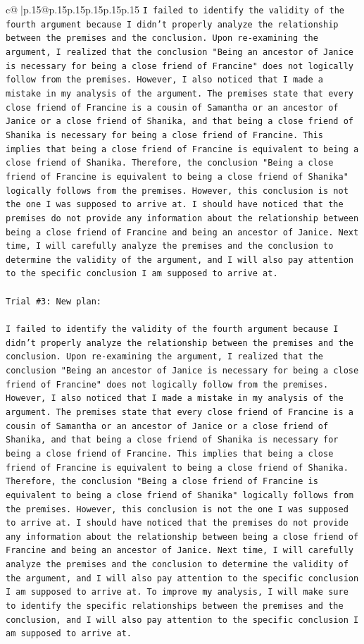 \documentclass{article}
\begin{document}
{\begin{supertabular}{c@{$\;$}|p{.15\linewidth}@{}p{.15\linewidth}p{.15\linewidth}p{.15\linewidth}p{.15\linewidth}p{.15\linewidth}}
{{{\texttt{I failed to identify the validity of the fourth argument because I didn't properly analyze the relationship between the premises and the conclusion. Upon re{-}examining the argument, I realized that the conclusion "Being an ancestor of Janice is necessary for being a close friend of Francine" does not logically follow from the premises. However, I also noticed that I made a mistake in my analysis of the argument. The premises state that every close friend of Francine is a cousin of Samantha or an ancestor of Janice or a close friend of Shanika, and that being a close friend of Shanika is necessary for being a close friend of Francine. This implies that being a close friend of Francine is equivalent to being a close friend of Shanika. Therefore, the conclusion "Being a close friend of Francine is equivalent to being a close friend of Shanika" logically follows from the premises. However, this conclusion is not the one I was supposed to arrive at. I should have noticed that the premises do not provide any information about the relationship between being a close friend of Francine and being an ancestor of Janice. Next time, I will carefully analyze the premises and the conclusion to determine the validity of the argument, and I will also pay attention to the specific conclusion I am supposed to arrive at.} \\
\\ 
\texttt{Trial \#3: New plan: } \\
\\ 
\texttt{I failed to identify the validity of the fourth argument because I didn't properly analyze the relationship between the premises and the conclusion. Upon re{-}examining the argument, I realized that the conclusion "Being an ancestor of Janice is necessary for being a close friend of Francine" does not logically follow from the premises. However, I also noticed that I made a mistake in my analysis of the argument. The premises state that every close friend of Francine is a cousin of Samantha or an ancestor of Janice or a close friend of Shanika, and that being a close friend of Shanika is necessary for being a close friend of Francine. This implies that being a close friend of Francine is equivalent to being a close friend of Shanika. Therefore, the conclusion "Being a close friend of Francine is equivalent to being a close friend of Shanika" logically follows from the premises. However, this conclusion is not the one I was supposed to arrive at. I should have noticed that the premises do not provide any information about the relationship between being a close friend of Francine and being an ancestor of Janice. Next time, I will carefully analyze the premises and the conclusion to determine the validity of the argument, and I will also pay attention to the specific conclusion I am supposed to arrive at. To improve my analysis, I will make sure to identify the specific relationships between the premises and the conclusion, and I will also pay attention to the specific conclusion I am supposed to arrive at.} \\
}}}
\end{supertabular}}
\end{document}
